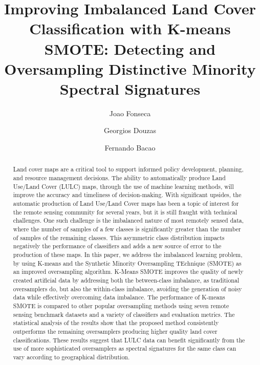 \documentclass[preprint,12pt]{elsarticle}
\date{}
\begin{document}
\begin{frontmatter}

\title{Improving Imbalanced Land Cover Classification with K-means SMOTE:
Detecting and Oversampling Distinctive Minority Spectral Signatures}


\author[inst1]{Joao Fonseca} 
\author[inst1]{Georgios Douzas}
\author[inst1]{Fernando Bacao}


\begin{abstract}
    Land cover maps are a critical tool to support informed policy
    development, planning, and resource management decisions. The ability to
    automatically produce Land Use/Land Cover (LULC) maps, through the use of
    machine learning methods, will improve the accuracy and timeliness of
    decision-making. With significant upsides, the automatic production of
    Land Use/Land Cover maps has been a topic of interest for the remote
    sensing community for several years, but it is still fraught with
    technical challenges. One such challenge is the imbalanced nature of most
    remotely sensed data, where the number of samples of a few classes is
    significantly greater than the number of samples of the remaining classes.
    This asymmetric class distribution impacts negatively the performance of
    classifiers and adds a new source of error to the production of these
    maps. In this paper, we address the imbalanced learning problem, by using
    K-means and the Synthetic Minority Oversampling TEchnique (SMOTE) as an
    improved oversampling algorithm. K-Means SMOTE improves the quality of
    newly created artificial data by addressing both the between-class
    imbalance, as traditional oversamplers do, but also the within-class
    imbalance, avoiding the generation of noisy data while effectively
    overcoming data imbalance. The performance of K-means SMOTE is compared to
    other popular oversampling methods using seven remote sensing benchmark
    datasets and a variety of classifiers and evaluation metrics. The
    statistical analysis of the results show that the proposed method
    consistently outperforms the remaining oversamplers producing higher
    quality land cover classifications. These results suggest that LULC data
    can benefit significantly from the use of more sophisticated oversamplers
    as spectral signatures for the same class can vary according to
    geographical distribution.
\end{abstract}



\end{frontmatter}
\end{document}
